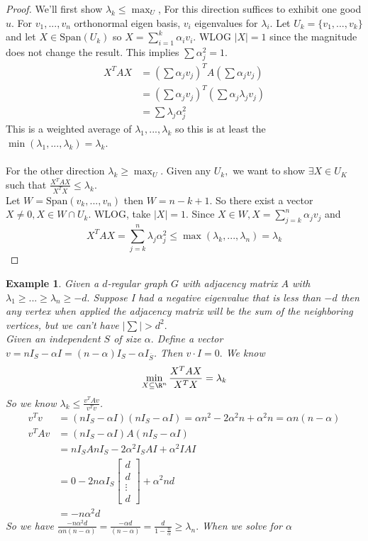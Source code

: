 \documentclass[a4paper]{article}
\newtheorem{eg}[thm]{Example}
\begin{document}
\begin{proof}
    We'll first show $\lambda_k\leq \max_U$, For this direction suffices to exhibit one good $u.$ For $v_1,...,v_n$ orthonormal eigen basis, $v_i$ eigenvalues for $\lambda_i$. Let $U_k=\{v_1,...,v_k\}$ and let $X\in \text{Span}(U_k)$ so $X=\sum_{i=1}^{k}\alpha_iv_i.$ WLOG $|X|=1$ since the magnitude does not change the result. This implies $\sum\alpha_j^2=1.$ \\
    \begin{align}
        X^TAX&=\left (\sum\alpha_jv_j\right )^TA\left (\sum\alpha_jv_j\right )\\
        &=\left (\sum\alpha_jv_j\right )^T\left (\sum\alpha_j\lambda_j v_j\right )\\
        &=\sum\lambda_j\alpha_j^2
    \end{align}
    This is a weighted average of $\lambda_1,...,\lambda_k$ so this is at least the $\min(\lambda_1,...,\lambda_k)=\lambda_k.$\\\\
    For the other direction $\lambda_k\geq \max_U$. Given any $U_k,$ we want to show $\exists X\in U_K$ such that $\frac{X^TAX}{X^TX}\leq \lambda_k.$\\
    Let $W=\text{Span}(v_k,...,v_n)$ then $W=n-k+1$. So there exist a vector $X\neq 0, X\in W\cap U_k.$ WLOG, take $|X|=1$. Since $X\in W, X=\sum_{j=k}^n\alpha_jv_j$ and $$X^TAX=\sum_{j=k}^n\lambda_j\alpha_j^2\leq \max(\lambda_k,...,\lambda_n)=\lambda_k$$
\end{proof}
\begin{eg}
    Given a $d$-regular graph $G$ with adjacency matrix $A$ with $\lambda_1\geq...\geq \lambda_n\geq -d.$ Suppose I had a negative eigenvalue that is less than $-d$ then any vertex when applied the adjacency matrix will be the sum of the neighboring vertices, but we can't have $|\sum|>d^2.$ \\
    Given an independent $S$ of size $\alpha.$ Define a vector $v=nI_S-\alpha I=(n-\alpha)I_S-\alpha I_{\overline{S}}$. Then $v\cdot I = 0.$ We know $$\min_{X\subseteq \R^n}\frac{X^TAX}{X^TX}=\lambda_k$$
    So we know $\lambda_k\leq \frac{v^TAv}{v^Tv}$. \begin{align}
        v^Tv&=(nI_S-\alpha I)(nI_S-\alpha I)=\alpha n^2-2\alpha^2n+\alpha^2n=\alpha n (n-\alpha) \\
        v^TAv &= (nI_S-\alpha I)A(nI_S-\alpha I)\\
        &=n I_S A n I_S - 2\alpha^2 I_S A I +\alpha^2 I A I\\
        &= 0-2n\alpha I_S\begin{bmatrix}
            d \\ d \\ \vdots \\ d
        \end{bmatrix} +\alpha^2nd\\
        &=-n\alpha^2 d
    \end{align}
    So we have $\frac{-n\alpha^2d}{\alpha n (n-\alpha)}=\frac{-\alpha d}{(n-\alpha)}=\frac{d}{1-\frac{n}{\alpha}}\geq \lambda_n.$ When we solve for $\alpha$
\end{eg}
\end{document}
